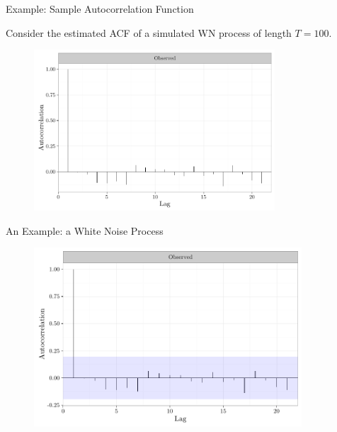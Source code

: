 \documentclass[envcountsect,usenames,dvipsnames]{beamer}
\theoremstyle{mystyle}
\begin{document}
\begin{frame}{Example: Sample Autocorrelation Function}
	 
	\begin{exampleblock}{ }
		Consider the estimated ACF of a simulated WN process of length $T = 100$.
	\end{exampleblock}
	
	\vspace{-0.15cm}
	
	\begin{figure}
	    \centering
	  \includegraphics[width = 9cm]{Images/acf1}
	\end{figure}
	
\end{frame}


\begin{frame}{An Example: a White Noise Process}

	\begin{figure}
	    \centering
	  \includegraphics[width = 10cm]{Images/acf2}
	\end{figure}
	
\end{frame}
\end{document}
